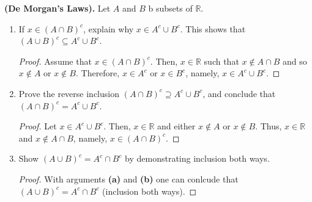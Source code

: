 \documentclass[12pt]{article}
\newcommand{\R}{\mathbb{R}}
\newenvironment{problem}[2][Problem]{\begin{trivlist}
		\item[\hskip \labelsep {\bfseries #1}\hskip \labelsep {\bfseries #2.}]}{\end{trivlist}}
\begin{document}
	\begin{problem}{1.2.5}
		\textbf{(De Morgan's Laws).} Let $A$ and $B$ b subsets of $\R$. 
		\begin{enumerate}[label=(\alph*)]
			\item If $x\in (A\cap B)^{c}$, explain why $x\in A^{c}\cup B^{c}$. This shows that $(A\cup B)^{c} \subseteq A^{c}\cup B^{c}$.
			\begin{proof}
			 Assume that $x\in (A\cap B)^{c}$. Then, $x\in \R$ such that $x\not\in A\cap B$ and so $x\not\in A$ or $x\not\in B$. Therefore, $x\in A^{c}$ or $x\in B^{c}$, namely, $x\in A^{c} \cup B^{c}$.
			\end{proof}
		
			\item Prove the reverse inclusion $(A\cap B)^{c} \supseteq A^{c}\cup B^{c}$, and conclude that $(A\cap B)^{c} = A^{c}\cup B^{c}$.
			\begin{proof}
				Let $x\in A^{c}\cup B^{c}$. Then, $x\in \R$ and either $x\notin A$ or $x\notin B$. Thus, $x\in \R$ and $x\notin A\cap B$, namely, $x\in (A\cap B)^{c}$.
			\end{proof}
		
			\item Show $(A\cup B)^{c} = A^{c} \cap B^{c}$ by demonstrating inclusion both ways.
			\begin{proof}
				With arguments \textbf{(a)} and \textbf{(b)} one can conlcude that $(A\cup B)^{c} = A^{c} \cap B^{c}$ (inclusion both ways).
			\end{proof}
		\end{enumerate}
	\end{problem}
\end{document}
